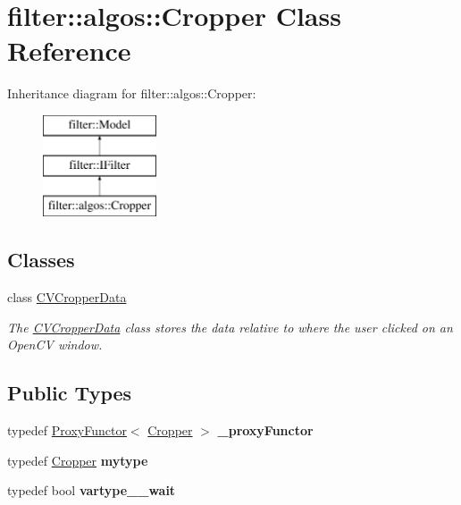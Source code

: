 \hypertarget{classfilter_1_1algos_1_1_cropper}{}\section{filter\+:\+:algos\+:\+:Cropper Class Reference}
\label{classfilter_1_1algos_1_1_cropper}
Inheritance diagram for filter\+:\+:algos\+:\+:Cropper\+:\begin{figure}[H]
\begin{center}
\leavevmode
\includegraphics[height=3.000000cm]{d5/d9d/classfilter_1_1algos_1_1_cropper}
\end{center}
\end{figure}
\subsection*{Classes}
\begin{DoxyCompactItemize}
\item 
class \hyperlink{classfilter_1_1algos_1_1_cropper_1_1_c_v_cropper_data}{C\+V\+Cropper\+Data}
\begin{DoxyCompactList}\small\item\em The \hyperlink{classfilter_1_1algos_1_1_cropper_1_1_c_v_cropper_data}{C\+V\+Cropper\+Data} class stores the data relative to where the user clicked on an Open\+CV window. \end{DoxyCompactList}\end{DoxyCompactItemize}
\subsection*{Public Types}
\begin{DoxyCompactItemize}
\item 
\mbox{\label{classfilter_1_1algos_1_1_cropper_a11c140066a6f2ab920f681dfbf805d72}} 
typedef \hyperlink{class_proxy_functor}{Proxy\+Functor}$<$ \hyperlink{classfilter_1_1algos_1_1_cropper}{Cropper} $>$ {\bfseries \+\_\+proxy\+Functor}
\item 
\mbox{\label{classfilter_1_1algos_1_1_cropper_aef731a216e801db61284b47f33d19033}} 
typedef \hyperlink{classfilter_1_1algos_1_1_cropper}{Cropper} {\bfseries mytype}
\item 
\mbox{\label{classfilter_1_1algos_1_1_cropper_aa90d073a66e20ca9164736d0449cc2c1}} 
typedef bool {\bfseries vartype\+\_\+\+\_\+wait}
\end{DoxyCompactItemize}
